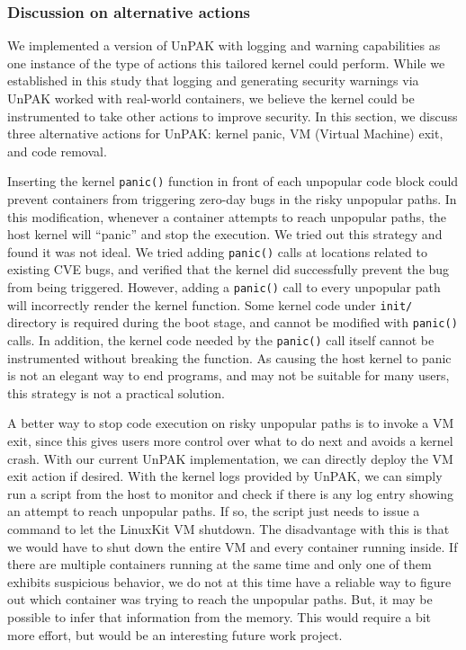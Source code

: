 \subsubsection{Discussion on alternative actions}
\label{sec.evaluation.3.2} 
We  implemented a version of UnPAK with logging and warning capabilities as one instance of the type of actions this tailored kernel could perform. 
While we established in this study that logging and generating security warnings via UnPAK worked with real-world containers, 
we believe the kernel could  be instrumented to take other actions to improve security. 
In this section, we discuss three alternative actions for UnPAK: kernel panic, VM (Virtual Machine) exit, and code removal. 

Inserting the kernel \texttt{panic()} function in front of each unpopular code block could prevent containers from triggering zero-day bugs in the risky unpopular paths. 
In this modification, whenever a container attempts to reach unpopular paths, the host kernel will ``panic'' and stop the execution. 
We tried out this strategy and found it was not ideal. We tried adding \texttt{panic()} calls at locations related to existing CVE bugs, 
and verified that the kernel did successfully prevent the bug from being triggered. However, adding a \texttt{panic()} call to every unpopular path will incorrectly render the kernel function. 
Some kernel code under \texttt{init/} directory is  required during the boot stage, and cannot be modified with \texttt{panic()} calls. 
In addition, the kernel code needed by the \texttt{panic()} call itself cannot be instrumented without  breaking the function. 
As causing the host kernel to panic is not an elegant way to end programs, and may not be suitable for many users, this strategy is not a practical solution. 

A better way to stop code execution on risky unpopular paths is to invoke a VM exit, since this gives users more control over what to do next and avoids a kernel crash. 
With our current UnPAK implementation, we can directly deploy the VM exit action if desired. 
With the kernel logs provided by UnPAK, we can simply run a script from the host to monitor and check if there is any log entry showing an attempt to reach unpopular paths. 
If so, the script just needs to issue a command to let the LinuxKit VM shutdown. 
The disadvantage with this is that we would have to shut down the entire VM and every container running inside. 
If there are multiple containers running at the same time and only one of them exhibits suspicious behavior, 
we do not at this time have a reliable way to figure out which container was trying to reach the unpopular paths. 
But, it may be possible to infer that information from the memory. This would require a bit more effort, but  would be an interesting future work project.


